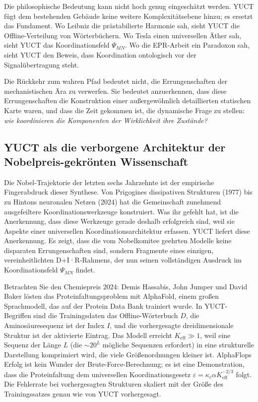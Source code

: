 \documentclass[12pt,a4paper]{article}
\begin{document}
	Die philosophische Bedeutung kann nicht hoch genug eingeschätzt werden. YUCT fügt dem bestehenden Gebäude keine weitere Komplexitätsebene hinzu; es ersetzt das Fundament. Wo Leibniz die prästabilierte Harmonie sah, sieht YUCT die Offline-Verteilung von Wörterbüchern. Wo Tesla einen universellen Äther sah, sieht YUCT das Koordinationsfeld \(\Psi_{MN}\). Wo die EPR-Arbeit ein Paradoxon sah, sieht YUCT den Beweis, dass Koordination ontologisch vor der Signalübertragung steht.
	
	Die Rückkehr zum wahren Pfad bedeutet nicht, die Errungenschaften der mechanistischen Ära zu verwerfen. Sie bedeutet anzuerkennen, dass diese Errungenschaften die Konstruktion einer außergewöhnlich detaillierten statischen Karte waren, und dass die Zeit gekommen ist, die dynamische Frage zu stellen: \emph{wie koordinieren die Komponenten der Wirklichkeit ihre Zustände?}
	
	\subsection{YUCT als die verborgene Architektur der Nobelpreis-gekrönten Wissenschaft}
	
	Die Nobel-Trajektorie der letzten sechs Jahrzehnte ist der empirische Fingerabdruck dieser Synthese. Von Prigogines dissipativen Strukturen (1977) bis zu Hintons neuronalen Netzen (2024) hat die Gemeinschaft zunehmend ausgefeiltere Koordinationswerkzeuge konstruiert. Was ihr gefehlt hat, ist die Anerkennung, dass diese Werkzeuge gerade deshalb erfolgreich sind, weil sie Aspekte einer universellen Koordinationsarchitektur erfassen. YUCT liefert diese Anerkennung. Es zeigt, dass die vom Nobelkomitee geehrten Modelle keine disparaten Errungenschaften sind, sondern Fragmente eines einzigen, vereinheitlichten D+I·R-Rahmens, der nun seinen vollständigen Ausdruck im Koordinationsfeld \(\Psi_{MN}\) findet.
	
	Betrachten Sie den Chemiepreis 2024: Demis Hassabis, John Jumper und David Baker lösten das Proteinfaltungsproblem mit AlphaFold, einem großen Sprachmodell, das auf der Protein Data Bank trainiert wurde. In YUCT-Begriffen sind die Trainingsdaten das Offline-Wörterbuch \(D\), die Aminosäuresequenz ist der Index \(I\), und die vorhergesagte dreidimensionale Struktur ist der aktivierte Eintrag. Das Modell erreicht \(K_{\mathrm{eff}} \gg 1\), weil eine Sequenz der Länge \(L\) (die \(\sim 20^L\) mögliche Sequenzen erfordert) in eine strukturelle Darstellung komprimiert wird, die viele Größenordnungen kleiner ist. AlphaFlops Erfolg ist kein Wunder der Brute-Force-Berechnung; es ist eine Demonstration, dass die Proteinfaltung dem universellen Koordinationsgesetz \(\varepsilon = \kappa_c \alpha K_{\mathrm{eff}}^{-2/3}\) folgt. Die Fehlerrate bei vorhergesagten Strukturen skaliert mit der Größe des Trainingssatzes genau wie von YUCT vorhergesagt.
	
\end{document}
